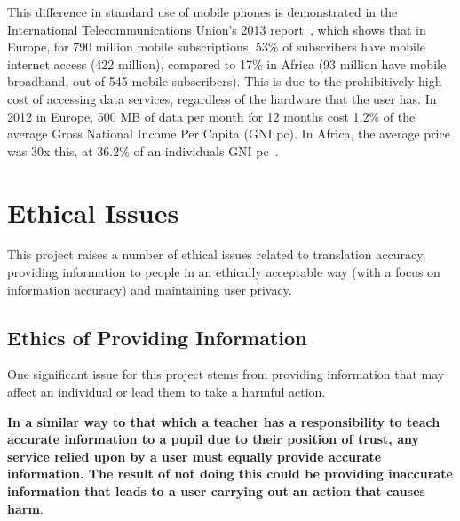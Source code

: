 \documentclass[authoryearcitations]{UoYCSproject}
\begin{document}
This difference in standard use of mobile phones is demonstrated in the International Telecommunications Union's 2013 report~\cite{ITU_Cell_Usage_2013}, which shows that in Europe, for 790 million mobile subscriptions, 53\% of subscribers have mobile internet access (422 million), compared to 17\% in Africa (93 million have mobile broadband, out of 545 mobile subscribers).  This is due to the prohibitively high cost of accessing data services, regardless of the hardware that the user has.  In 2012 in Europe, 500 MB of data per month for 12 months cost 1.2\% of the average Gross National Income Per Capita (GNI pc).  In Africa, the average price was 30x this, at 36.2\% of an individuals GNI pc~\cite{ITU_Information_Society_2013}.


\section{Ethical Issues}
This project raises a number of ethical issues related to translation accuracy, providing information to people in an ethically acceptable way (with a focus on information accuracy) and maintaining user privacy.

\subsection{Ethics of Providing Information}
One significant issue for this project stems from providing information that may affect an individual or lead them to take a harmful action.


{\bf In a similar way to that which a teacher has a responsibility to teach accurate information to a pupil due to their position of trust, any service relied upon by a user must equally provide accurate information.  The result of not doing this could be providing inaccurate information that leads to a user carrying out an action that causes harm}.


\end{document}
